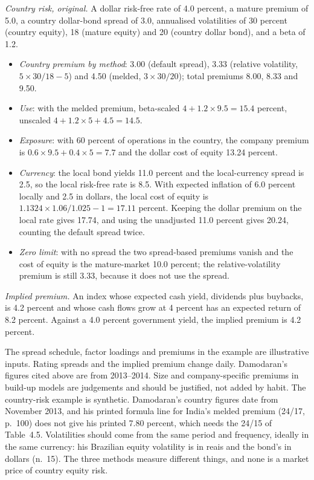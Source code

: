 \begin{qfmethod}
\emph{Country risk, original.} A dollar risk-free rate of 4.0 percent, a mature premium of 5.0, a country dollar-bond spread of 3.0, annualised volatilities of 30 percent (country equity), 18 (mature equity) and 20 (country dollar bond), and a beta of 1.2.
\begin{itemize}
\item \emph{Country premium by method}: 3.00 (default spread), 3.33 (relative volatility, $5\times30/18-5$) and 4.50 (melded, $3\times30/20$); total premiums 8.00, 8.33 and 9.50.
\item \emph{Use}: with the melded premium, beta-scaled $4+1.2\times9.5=15.4$ percent, unscaled $4+1.2\times5+4.5=14.5$.
\item \emph{Exposure}: with 60 percent of operations in the country, the company premium is $0.6\times9.5+0.4\times5=7.7$ and the dollar cost of equity 13.24 percent.
\item \emph{Currency}: the local bond yields 11.0 percent and the local-currency spread is 2.5, so the local risk-free rate is 8.5. With expected inflation of 6.0 percent locally and 2.5 in dollars, the local cost of equity is $1.1324\times1.06/1.025-1=17.11$ percent. Keeping the dollar premium on the local rate gives 17.74, and using the unadjusted 11.0 percent gives 20.24, counting the default spread twice.
\item \emph{Zero limit}: with no spread the two spread-based premiums vanish and the cost of equity is the mature-market 10.0 percent; the relative-volatility premium is still 3.33, because it does not use the spread.
\end{itemize}

\emph{Implied premium.} An index whose expected cash yield, dividends plus buybacks, is 4.2 percent and whose cash flows grow at 4 percent has an expected return of 8.2 percent. Against a 4.0 percent government yield, the implied premium is 4.2 percent.

 The spread schedule, factor loadings and premiums in the example are illustrative inputs. Rating spreads and the implied premium change daily. Damodaran's figures cited above are from 2013--2014. Size and company-specific premiums in build-up models are judgements and should be justified, not added by habit. The country-risk example is synthetic. Damodaran's country figures date from November 2013, and his printed formula line for India's melded premium (24/17, p.~100) does not give his printed 7.80 percent, which needs the 24/15 of Table~4.5. Volatilities should come from the same period and frequency, ideally in the same currency: his Brazilian equity volatility is in reais and the bond's in dollars (n.~15). The three methods measure different things, and none is a market price of country equity risk.


\end{qfmethod}
